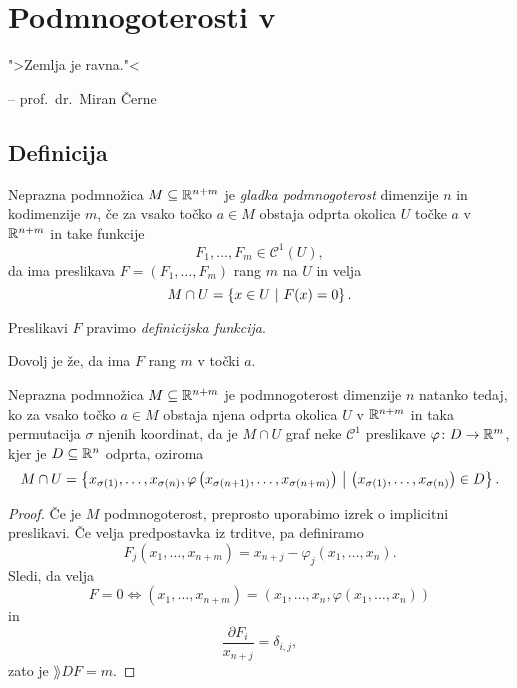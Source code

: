 \section{Podmnogoterosti v }

\epigraph{">Zemlja je ravna."<}{-- prof.~dr.~Miran Černe}

\subsection{Definicija}


\begin{definicija}
Neprazna podmnožica $M \subseteq \mathbb{R}^{n+m}$ je
\emph{gladka podmnogoterost} dimenzije $n$ in
kodimenzije $m$, če za vsako točko $a \in M$ obstaja odprta okolica
$U$ točke $a$ v $\mathbb{R}^{n+m}$ in take funkcije
\[
F_1, \dots, F_m \in \mathcal{C}^1(U),
\]
da ima preslikava $F = (F_1, \dots, F_m)$ rang $m$ na $U$ in velja
\[
M \cap U = \left\{x \in U~\middle\vert~F(x) = 0\right\}.
\]
\end{definicija}

\begin{opomba}
Preslikavi $F$ pravimo
\emph{definicijska funkcija}.
\end{opomba}

\begin{opomba}
Dovolj je že, da ima $F$ rang $m$ v točki $a$.
\end{opomba}

\begin{trditev}
Neprazna podmnožica $M \subseteq \mathbb{R}^{n+m}$ je podmnogoterost
dimenzije $n$ natanko tedaj, ko za vsako točko $a \in M$ obstaja
njena odprta okolica $U$ v $\mathbb{R}^{n+m}$ in taka permutacija $\sigma$
njenih koordinat, da je $M \cap U$ graf neke $\mathcal{C}^1$
preslikave $\varphi \colon D \to \mathbb{R}^m$, kjer je $D \subseteq \mathbb{R}^n$
odprta, oziroma
\[
M \cap U = \left\{x_{\sigma(1)}, \dots, x_{\sigma(n)},
\varphi\left(x_{\sigma(n+1)}, \dots, x_{\sigma(n+m)}\right)~\middle\vert~\left(x_{\sigma(1)}, \dots, x_{\sigma(n)}\right) \in D\right\}.
\]
\end{trditev}

\begin{proof}
Če je $M$ podmnogoterost, preprosto uporabimo izrek o implicitni
preslikavi. Če velja predpostavka iz trditve, pa definiramo
\[
F_j(x_1, \dots, x_{n+m}) = x_{n+j} - \varphi_j(x_1, \dots, x_n).
\]
Sledi, da velja
\[
F = 0 \iff (x_1, \dots, x_{n+m}) =
(x_1, \dots, x_n, \varphi(x_1, \dots, x_n))
\]
in
\[
\frac{\partial F_i}{x_{n+j}} = \delta_{i,j},
\]
zato je $\rang DF = m$.
\end{proof}

